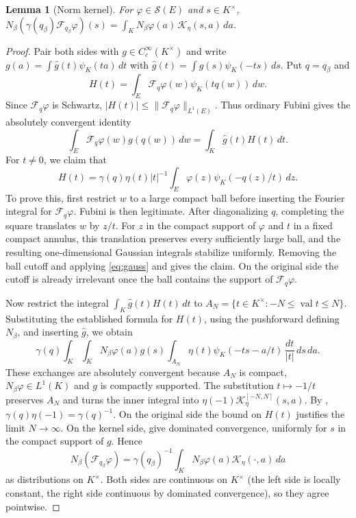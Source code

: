 \documentclass[11pt,oneside,notitlepage]{book}
\numberwithin{equation}{section}
\theoremstyle{plain}
\newtheorem{lemma}[theorem]{Lemma}
\theoremstyle{definition}
\newcommand{\cS}{\mathcal{S}}
\newcommand{\val}{\operatorname{val}}
\begin{document}
\begin{lemma}[Norm kernel]\label{lem:norm-kernel}
For $\varphi\in\cS(E)$ and $s\in K^\times$, $N_\beta(\gamma(q_\beta)\mathcal F_{q_\beta}\varphi)(s)=\int_KN_\beta\varphi(a)\,\mathcal K_\eta(s,a)\,da$.
\end{lemma}
\begin{proof}
Pair both sides with $g\in C_c^\infty(K^\times)$ and write $g(a)=\int\hat g(t)\psi_K(ta)\,dt$ with $\hat g(t)=\int g(s)\psi_K(-ts)\,ds$. Put $q=q_\beta$ and
\[
H(t)=\int_E\mathcal F_q\varphi(w)\psi_K(tq(w))\,dw.
\]
Since $\mathcal F_q\varphi$ is Schwartz, $|H(t)|\le\|\mathcal F_q\varphi\|_{L^1(E)}$. Thus ordinary Fubini gives the absolutely convergent identity
\[
\int_E\mathcal F_q\varphi(w)g(q(w))\,dw
=\int_K\hat g(t)H(t)\,dt.
\]
For $t\ne0$, we claim that
\[
H(t)=\gamma(q)\eta(t)|t|^{-1}
\int_E\varphi(z)\psi_K(-q(z)/t)\,dz.
\]
To prove this, first restrict $w$ to a large compact ball before inserting the Fourier integral for $\mathcal F_q\varphi$. Fubini is then legitimate. After diagonalizing $q$, completing the square translates $w$ by $z/t$. For $z$ in the compact support of $\varphi$ and $t$ in a fixed compact annulus, this translation preserves every sufficiently large ball, and the resulting one-dimensional Gaussian integrals stabilize uniformly. Removing the ball cutoff and applying \eqref{eq:gauss} and  gives the claim. On the original side the cutoff is already irrelevant once the ball contains the support of $\mathcal F_q\varphi$.

Now restrict the integral $\int_K\hat g(t)H(t)\,dt$ to $A_N=\{t\in K^\times:-N\le\val t\le N\}$. Substituting the established formula for $H(t)$, using the pushforward defining $N_\beta$, and inserting $\hat g$, we obtain
\[
\gamma(q)\int_K\!\int_K N_\beta\varphi(a)g(s)
\int_{A_N}\eta(t)\psi_K(-ts-a/t)\,\frac{dt}{|t|}\,ds\,da.
\]
These exchanges are absolutely convergent because $A_N$ is compact, $N_\beta\varphi\in L^1(K)$ and $g$ is compactly supported. The substitution $t\mapsto-1/t$ preserves $A_N$ and turns the inner integral into $\eta(-1)\mathcal K_\eta^{[-N,N]}(s,a)$. By , $\gamma(q)\eta(-1)=\gamma(q)^{-1}$. On the original side the bound on $H(t)$ justifies the limit $N\to\infty$. On the kernel side,  give dominated convergence, uniformly for $s$ in the compact support of $g$. Hence
\[
N_\beta(\mathcal F_{q_\beta}\varphi)
=\gamma(q_\beta)^{-1}\int_KN_\beta\varphi(a)\mathcal K_\eta(\cdot,a)\,da
\]
as distributions on $K^\times$. Both sides are continuous on $K^\times$ (the left side is locally constant, the right side continuous by dominated convergence), so they agree pointwise.
\end{proof}
\end{document}
